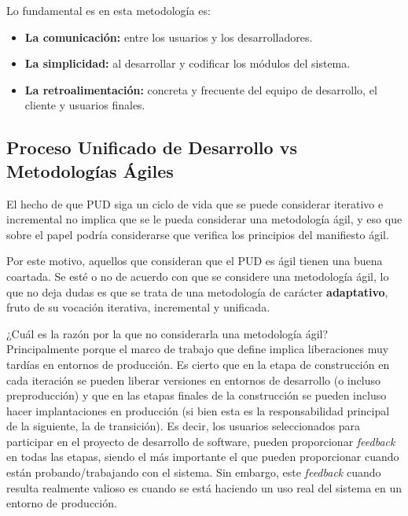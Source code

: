       Lo fundamental es en esta metodología es:
      \begin{itemize}
        \item {\bf La comunicación:} entre los usuarios y los desarrolladores.
        \item {\bf La simplicidad:} al desarrollar y codificar los módulos del sistema.
        \item {\bf La retroalimentación:} concreta y frecuente del equipo de desarrollo, el cliente y usuarios finales.
      \end{itemize}
      
    

  \subsection{Proceso Unificado de Desarrollo vs Metodologías Ágiles} %
    \label{sub:proceso_unificado_de_desarrollo_vs_metodologias_agiles}

    El hecho de que PUD siga un ciclo de vida que se puede considerar iterativo e incremental no implica que se le pueda considerar una metodología ágil, y eso que sobre el papel podría considerarse que verifica los principios del manifiesto ágil.

    Por este motivo, aquellos que consideran que el PUD es ágil tienen una buena coartada. Se esté o no de acuerdo con que se considere una metodología ágil, lo que no deja dudas es que se trata de una metodología de carácter {\bf adaptativo}, fruto de su vocación iterativa, incremental y unificada.

    ¿Cuál es la razón por la que no considerarla una metodología ágil? Principalmente porque el marco de trabajo que define implica liberaciones muy tardías en entornos de producción. Es cierto que en la etapa de construcción en cada iteración se pueden liberar versiones en entornos de desarrollo (o incluso preproducción) y que en las etapas finales de la construcción se pueden incluso hacer implantaciones en producción (si bien esta es la responsabilidad principal de la siguiente, la de transición). Es decir, los usuarios seleccionados para participar en el proyecto de desarrollo de software, pueden proporcionar {\it feedback} en todas las etapas, siendo el más importante el que pueden proporcionar cuando están probando/trabajando con el sistema. Sin embargo, este {\it feedback} cuando resulta realmente valioso es cuando se está haciendo un uso real del sistema en un entorno de producción.

